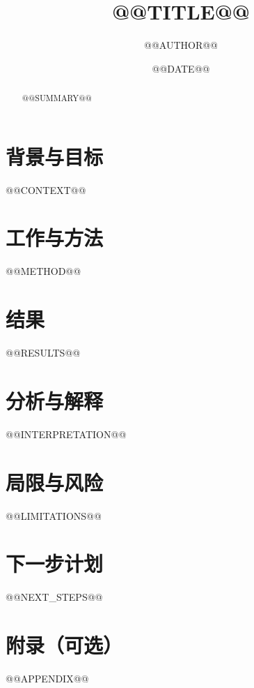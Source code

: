 \documentclass[lang=cn,a4paper,11pt]{elegantpaper}
\title{@@TITLE@@}
\author{@@AUTHOR@@}
\institute{}
\date{@@DATE@@}
\begin{document}
\maketitle

\begin{abstract}
@@SUMMARY@@
\end{abstract}

\section{背景与目标}
@@CONTEXT@@

\section{工作与方法}
@@METHOD@@

\section{结果}
@@RESULTS@@

\section{分析与解释}
@@INTERPRETATION@@

\section{局限与风险}
@@LIMITATIONS@@

\section{下一步计划}
@@NEXT_STEPS@@

\appendix
\section{附录（可选）}
@@APPENDIX@@

\end{document}
